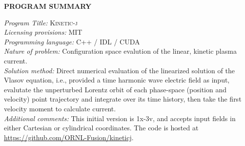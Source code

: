 \documentclass[final,5p,times,twocolumn]{elsarticle}
\newcommand{\kj}{\textsc{Kinetic-j}\xspace}
\begin{document}
\linenumbers


{\bf PROGRAM SUMMARY}

\begin{small}
\noindent
{\em Program Title:} \kj                           \\
{\em Licensing provisions: }MIT                             \\
{\em Programming language: }C++ / IDL / CUDA                 \\
{\em Nature of problem: }Configuration space evalution of the linear, kinetic plasma current.\\
{\em Solution method: }Direct numerical evaluation of the linearized solution of the Vlasov equation, i.e., provided a time harmonic wave electric field as input, evalutate the unperturbed Lorentz orbit of each phase-space (position and velocity) point trajectory and integrate over its time history, then take the first velocity moment to calculate current.\\
{\em Additional comments:} This initial version is 1x-3v, and accepts input fields in either Cartesian or cylindrical coordinates. The code is hosted at \url{https://github.com/ORNL-Fusion/kineticj}.\\
\end{small}
%
\end{document}
